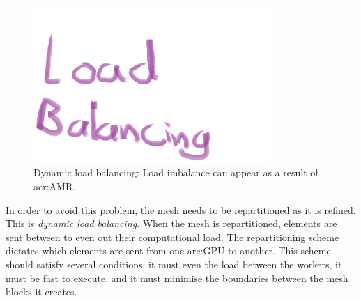 \begin{figure}[H]
	\centering
	\includegraphics[width=0.8\textwidth]{Chapter_introduction/media/dynamic_load_balancing}
	\caption{Dynamic load balancing: Load imbalance can appear as a result of \acrshort{acr:AMR}.}\label{fig:intro_load_balancing}
\end{figure}

In order to avoid this problem, the mesh needs to be repartitioned as it is refined. This is
\textit{dynamic load balancing}. When the mesh is repartitioned, elements are sent between
 to even out their computational load. The repartitioning scheme dictates which
elements are sent from one \acrshort{arc:GPU} to another. This scheme should satisfy several
conditions: it must even the load between the workers, it must be fast to execute, and it must
minimise the boundaries between the mesh blocks it creates. 

